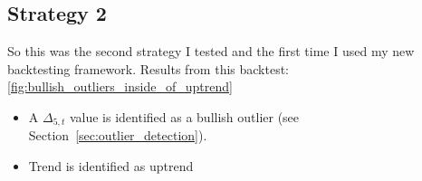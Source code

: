\documentclass[12pt]{article}
\begin{document}
\subsection{Strategy 2}

So this was the second strategy I tested and the first time I used my new backtesting framework. 
Results from this backtest: \ref{fig:bullish_outliers_inside_of_uptrend}

\begin{itemize}
  \item  A $\Delta_{5,t}$ value is identified as a bullish outlier (see Section~\ref{sec:outlier_detection}).
  \item Trend is identified as uptrend
\end{itemize}












\newpage
\end{document}
